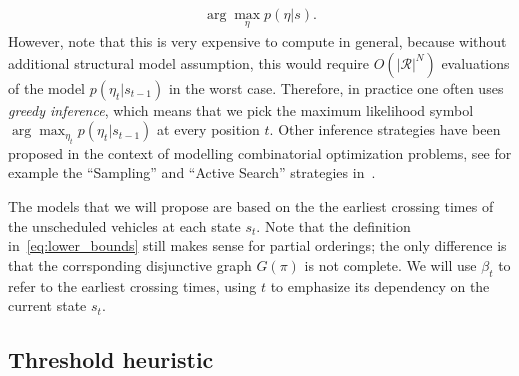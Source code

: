 \documentclass[a4paper]{article}
\theoremstyle{definition}
\theoremstyle{plain}
\begin{document}
\begin{align*}
  \arg\max_{\eta} p(\eta | s) .
\end{align*}
However, note that this is very expensive to compute in general, because without
additional structural model assumption, this would require
$O(|\mathcal{R}|^{N})$ evaluations of the model $p(\eta_{t}|s_{t-1})$ in the
worst case. Therefore, in practice one often uses \textit{greedy inference},
which means that we pick the maximum likelihood symbol
$\arg\max_{\eta_{t}} p(\eta_{t} | s_{t-1})$ at every position $t$.
Other inference strategies have been proposed in the context of modelling
combinatorial optimization problems, see for example the ``Sampling'' and
``Active Search'' strategies in~\cite{belloNeuralCombinatorialOptimization2017}.

%
%


The models that we will propose are based on the the earliest crossing times of
the unscheduled vehicles at each state $s_{t}$. Note that the definition in~\eqref{eq:lower_bounds}
still makes sense for partial orderings; the only difference is that the
corrsponding disjunctive graph $G(\pi)$ is not complete. We will use $\beta_{t}$ to
refer to the earliest crossing times, using $t$ to emphasize its dependency on
the current state $s_{t}$.



\subsection{Threshold heuristic}
\end{document}
